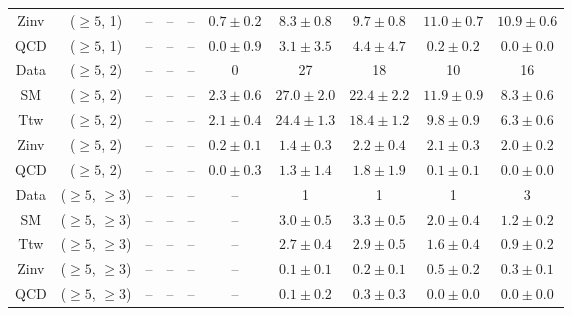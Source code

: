 \begin{table}[h!]
{\begin{tabular}{cccccccccc}
	Zinv & ($\ge5$, 1) & -- & -- & -- & $0.7\pm 0.2$ & $8.3\pm 0.8$ & $9.7\pm 0.8$ & $11.0\pm 0.7$ & $10.9\pm 0.6$ \\[0.5ex] 
	QCD & ($\ge5$, 1) & -- & -- & -- & $0.0\pm 0.9$ & $3.1\pm 3.5$ & $4.4\pm 4.7$ & $0.2\pm 0.2$ & $0.0\pm 0.0$ \\[0.5ex] 
	Data & ($\ge5$, 2) & -- & -- & -- & 0 & 27 & 18 & 10 & 16 \\[0.5ex] 
	SM & ($\ge5$, 2) & -- & -- & -- & $2.3\pm 0.6$ & $27.0\pm 2.0$ & $22.4\pm 2.2$ & $11.9\pm 0.9$ & $8.3\pm 0.6$ \\[0.5ex] 
	Ttw & ($\ge5$, 2) & -- & -- & -- & $2.1\pm 0.4$ & $24.4\pm 1.3$ & $18.4\pm 1.2$ & $9.8\pm 0.9$ & $6.3\pm 0.6$ \\[0.5ex] 
	Zinv & ($\ge5$, 2) & -- & -- & -- & $0.2\pm 0.1$ & $1.4\pm 0.3$ & $2.2\pm 0.4$ & $2.1\pm 0.3$ & $2.0\pm 0.2$ \\[0.5ex] 
	QCD & ($\ge5$, 2) & -- & -- & -- & $0.0\pm 0.3$ & $1.3\pm 1.4$ & $1.8\pm 1.9$ & $0.1\pm 0.1$ & $0.0\pm 0.0$ \\[0.5ex] 
	Data & ($\ge5$, $\ge3$) & -- & -- & -- & -- & 1 & 1 & 1 & 3 \\[0.5ex] 
	SM & ($\ge5$, $\ge3$) & -- & -- & -- & -- & $3.0\pm 0.5$ & $3.3\pm 0.5$ & $2.0\pm 0.4$ & $1.2\pm 0.2$ \\[0.5ex] 
	Ttw & ($\ge5$, $\ge3$) & -- & -- & -- & -- & $2.7\pm 0.4$ & $2.9\pm 0.5$ & $1.6\pm 0.4$ & $0.9\pm 0.2$ \\[0.5ex] 
	Zinv & ($\ge5$, $\ge3$) & -- & -- & -- & -- & $0.1\pm 0.1$ & $0.2\pm 0.1$ & $0.5\pm 0.2$ & $0.3\pm 0.1$ \\[0.5ex] 
	QCD & ($\ge5$, $\ge3$) & -- & -- & -- & -- & $0.1\pm 0.2$ & $0.3\pm 0.3$ & $0.0\pm 0.0$ & $0.0\pm 0.0$ \\[0.5ex] 
	\hline
	\hline
\end{tabular}}
\end{table}
